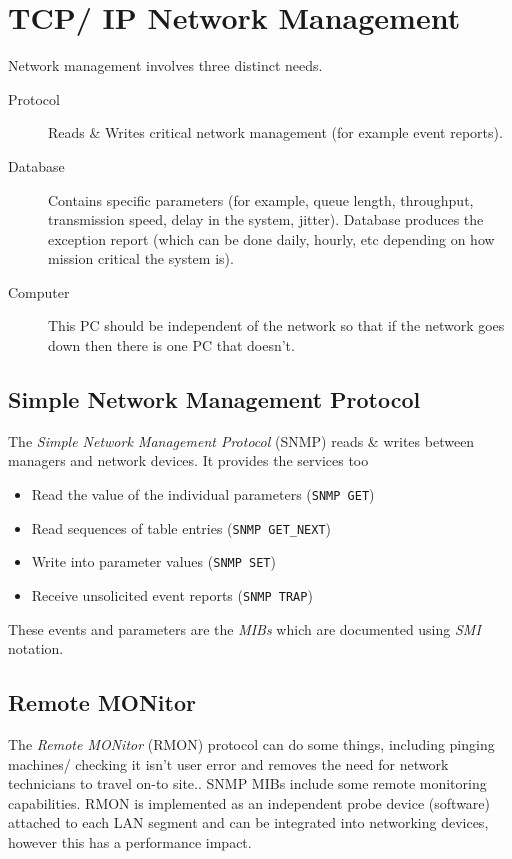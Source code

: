 \section*{TCP/ IP Network Management}
Network management involves three distinct needs.
\begin{description}
    \item[Protocol] Reads \& Writes critical network management (for example event reports).
    \item[Database] Contains specific parameters (for example, queue length, throughput, transmission speed, delay in the system, jitter). Database produces the exception report (which can be done daily, hourly, etc depending on how mission critical the system is). 
    \item[Computer] This PC should be independent of the network so that if the network goes down then there is one PC that doesn't.
\end{description}

\subsection*{Simple Network Management Protocol}
The \textit{Simple Network Management Protocol} (SNMP) reads \& writes between managers and network devices. It provides the services too
\begin{itemize}
    \item Read the value of the individual parameters (\texttt{SNMP GET})
    \item Read sequences of table entries (\texttt{SNMP GET\_NEXT})
    \item Write into parameter values (\texttt{SNMP SET})
    \item Receive unsolicited event reports (\texttt{SNMP TRAP})
\end{itemize}
These events and parameters are the \textit{MIBs} which are documented using \textit{SMI} notation. 

\subsection*{Remote MONitor}
The \textit{Remote MONitor} (RMON) protocol can do some things, including pinging machines/ checking it isn't user error and removes the need for network technicians to travel on-to site.. SNMP MIBs include some remote monitoring capabilities. RMON is implemented as an independent probe device (software) attached to each LAN segment and can be integrated into networking devices, however this has a performance impact. 

